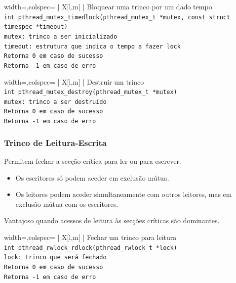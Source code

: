 \documentclass[11pt]{article}
\begin{document}
\begin{tblr}{width=\linewidth,colspec={ | X[l,m] | }}
    \hline
    \centering Bloquear uma trinco por um dado tempo               \\\hline
    \lstinline|int pthread_mutex_timedlock(pthread_mutex_t *mutex, const struct
    timespec *timeout)|                                            \\\hline
    \lstinline|mutex: trinco a ser inicializado|                   \\
    \lstinline|timeout: estrutura que indica o tempo a fazer lock| \\\hline
    \lstinline|Retorna 0 em caso de sucesso|                       \\
    \lstinline|Retorna -1 em caso de erro|                         \\\hline
\end{tblr}

\begin{tblr}{width=\linewidth,colspec={ | X[l,m] | }}
    \hline
    \centering Destruir um trinco                                 \\\hline
    \lstinline|int pthread_mutex_destroy(pthread_mutex_t *mutex)| \\\hline
    \lstinline|mutex: trinco a ser destruído|                     \\\hline
    \lstinline|Retorna 0 em caso de sucesso|                      \\
    \lstinline|Retorna -1 em caso de erro|                        \\\hline
\end{tblr}

\subsubsection{Trinco de Leitura-Escrita}

Permitem fechar a secção crítica para ler ou para escrever.
\begin{itemize}
    \item Os escritores só podem aceder em exclusão mútua.
    \item Os leitores podem aceder simultaneamente com outros leitores, mas em exclusão mútua com os escritores.
\end{itemize}

Vantajoso quando acessos de leitura às secções críticas são dominantes.

\begin{tblr}{width=\linewidth,colspec={ | X[l,m] | }}
    \hline
    \centering Fechar um trinco para leitura                      \\\hline
    \lstinline|int pthread_rwlock_rdlock(pthread_rwlock_t *lock)| \\\hline
    \lstinline|lock: trinco que será fechado|                     \\\hline
    \lstinline|Retorna 0 em caso de sucesso|                      \\
    \lstinline|Retorna -1 em caso de erro|                        \\\hline
\end{tblr}
\end{document}

